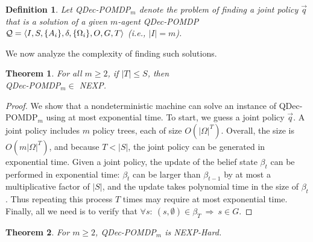 \documentclass[letterpaper]{article}
\newtheorem{theorem}{Theorem}
\newtheorem{definition}{Definition}
\theoremstyle{definition}
\begin{document}
\begin{definition}
Let QDec-POMDP$_m$ denote the problem of finding a joint policy $\vec{q}$ that is a solution of a given $m$-agent
QDec-POMDP ${\cal Q} = \langle  I, S, \{A_i\}, \delta, \{\Omega_i\}, O, G, T\rangle$ (i.e., $|I|=m$).
\end{definition}

We now analyze the complexity of finding such solutions.
\begin{theorem}
For all $m\geq2$, if $|T|\leq S$, then \\ QDec-POMDP$_m \in$ NEXP.
\end{theorem}

\begin{proof}
We show that a nondeterministic machine can solve an instance of QDec-POMDP$_m$ using at most exponential time.  To start, we guess a joint policy $\vec{q}$.
A joint policy includes $m$ policy trees, each of size $O(|\Omega|^T)$.  Overall, the size is $O(m|\Omega|^T)$, and because $T< |S|$, the joint policy can be generated in exponential time.  Given a joint policy, the update of the belief state $\beta_t$ can be performed in exponential time: $\beta_{t}$ can be larger than $\beta_{t-1}$ by at most a multiplicative factor of $|S|$, and the update takes polynomial time in the size of $\beta_{t}$. Thus repeating this process $T$ times may require at most exponential time.
Finally, all we need is to verify that $ \forall s :~ (s,\emptyset) \in \beta_T ~\Rightarrow~ s \in G $.
\end{proof}

\begin{theorem}
For $m\geq2$, QDec-POMDP$_m$ is NEXP-Hard.
\end{theorem}
\end{document}
